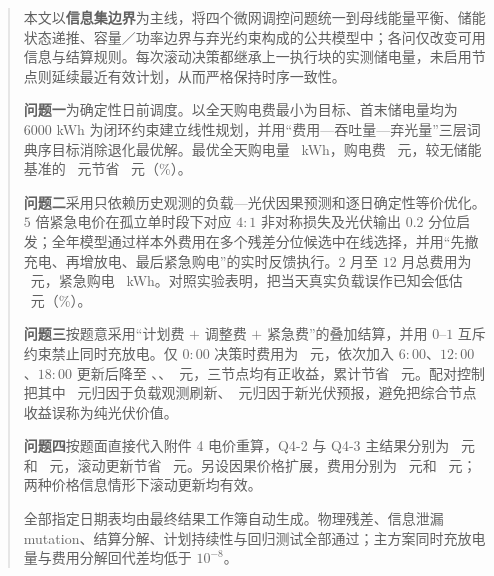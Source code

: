 \maketitle%
\thispagestyle{plain}%
\begin{abstract}%

	本文以\textbf{信息集边界}为主线，将四个微网调控问题统一到母线能量平衡、储能状态递推、容量／功率边界与弃光约束构成的公共模型中；各问仅改变可用信息与结算规则。每次滚动决策都继承上一执行块的实测储电量，未启用节点则延续最近有效计划，从而严格保持时序一致性。

	\textbf{问题一}为确定性日前调度。以全天购电费最小为目标、首末储电量均为 $6000$ kWh 为闭环约束建立线性规划，并用“费用—吞吐量—弃光量”三层词典序目标消除退化最优解。最优全天购电量 \QoneEnergy\ kWh，购电费 \QoneCost\ 元，较无储能基准的 \QoneNoStorage\ 元节省 \QoneSave\ 元（\QoneSavePct\%）。

	\textbf{问题二}采用只依赖历史观测的负载—光伏因果预测和逐日确定性等价优化。$5$ 倍紧急电价在孤立单时段下对应 $4:1$ 非对称损失及光伏输出 $0.2$ 分位启发；全年模型通过样本外费用在多个残差分位候选中在线选择，并用“先撤充电、再增放电、最后紧急购电”的实时反馈执行。$2$ 月至 $12$ 月总费用为 \QtwoTotal\ 元，紧急购电 \QtwoEmergency\ kWh。对照实验表明，把当天真实负载误作已知会低估 \DeltaLoad\ 元（\DeltaLoadPct\%）。

	\textbf{问题三}按题意采用“计划费 $+$ 调整费 $+$ 紧急费”的叠加结算，并用 $0$--$1$ 互斥约束禁止同时充放电。仅 $0{:}00$ 决策时费用为 \QthreeSzero\ 元，依次加入 $6{:}00$、$12{:}00$、$18{:}00$ 更新后降至 \QthreeSone、\QthreeStwo、\QthreeSthree\ 元，三节点均有正收益，累计节省 \QthreeVtotal\ 元。配对控制把其中 \QthreeLoadTotal\ 元归因于负载观测刷新、\QthreePvTotal\ 元归因于新光伏预报，避免把综合节点收益误称为纯光伏价值。

	\textbf{问题四}按题面直接代入附件 4 电价重算，Q4-2 与 Q4-3 主结果分别为 \QfourTwoMain\ 元和 \QfourThreeMain\ 元，滚动更新节省 \QfourRollPerfect\ 元。另设因果价格扩展，费用分别为 \QfourTwoCausal\ 元和 \QfourThreeCausal\ 元；两种价格信息情形下滚动更新均有效。

	全部指定日期表均由最终结果工作簿自动生成。物理残差、信息泄漏 mutation、结算分解、计划持续性与回归测试全部通过；主方案同时充放电量与费用分解回代差均低于 $10^{-8}$。

\end{abstract}
